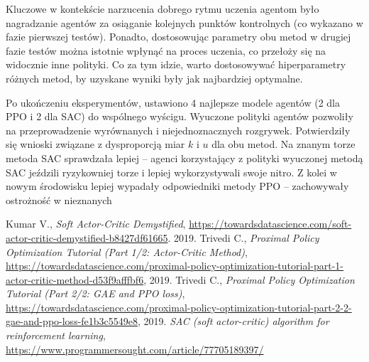 \documentclass[a4paper,12pt]{article}
\begin{document}
Kluczowe w kontekście narzucenia dobrego rytmu uczenia agentom było nagradzanie agentów za osiąganie kolejnych punktów kontrolnych (co wykazano w fazie pierwszej testów). Ponadto, dostosowując parametry obu metod w drugiej fazie testów można istotnie wpłynąć na proces uczenia, co przełoży się na widocznie inne polityki. Co za tym idzie, warto dostosowywać hiperparametry różnych metod, by uzyskane wyniki były jak najbardziej optymalne.

Po ukończeniu eksperymentów, ustawiono 4 najlepsze modele agentów (2 dla PPO i 2 dla SAC) do wspólnego wyścigu. Wyuczone polityki agentów pozwoliły na przeprowadzenie wyrównanych i niejednoznacznych rozgrywek. Potwierdziły się wnioski związane z dysproporcją miar $k$ i $u$ dla obu metod. Na znanym torze metoda SAC sprawdzała lepiej -- agenci korzystający z polityki wyuczonej metodą SAC jeździli ryzykowniej torze i lepiej wykorzystywali swoje nitro. Z kolei w nowym środowisku lepiej wypadały odpowiedniki metody PPO -- zachowywały ostrożność w nieznanych 

\begin{thebibliography}{20}
	Kumar V., \textit{Soft Actor-Critic Demystified}, \url{https://towardsdatascience.com/soft-actor-critic-demystified-b8427df61665}. 2019.
	 Trivedi C., \textit{Proximal Policy Optimization Tutorial (Part 1/2: Actor-Critic Method)}, \url{https://towardsdatascience.com/proximal-policy-optimization-tutorial-part-1-actor-critic-method-d53f9afffbf6}, 2019.
	 Trivedi C., \textit{Proximal Policy Optimization Tutorial (Part 2/2: GAE and PPO loss)}, \url{https://towardsdatascience.com/proximal-policy-optimization-tutorial-part-2-2-gae-and-ppo-loss-fe1b3c5549e8}, 2019.
	 \textit{SAC (soft actor-critic) algorithm for reinforcement learning}, \url{https://www.programmersought.com/article/77705189397/}
\end{thebibliography}
\end{document}
